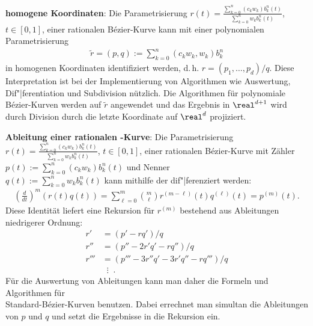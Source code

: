 \textbf{homogene Koordinaten}:
Die Parametrisierung
$r(t) = \frac{\sum_{k=0}^n (c_k w_k) b_k^n(t)}{\sum_{k=0}^n w_k b_k^n(t)}$, $t \in [0, 1]$,
einer rationalen Bézier-Kurve kann mit einer polynomialen Parametrisierung
\begin{align*}
    \widetilde{r} = (p, q) := \sum_{k=0}^n (c_k w_k, w_k) b_k^n
\end{align*}
in homogenen Koordinaten identifiziert werden, d.\,h. $r = (p_1, \dotsc, p_d)/q$.
Diese Interpretation ist bei der Implementierung von Algorithmen wie Auswertung, Dif"|ferentiation
und Subdivision nützlich.
Die Algorithmen für polynomiale Bézier-Kurven werden auf $\widetilde{r}$ angewendet und das
Ergebnis in $\real^{d+1}$ wird durch Division durch die letzte Koordinate auf $\real^d$ projiziert.

\linie

\textbf{Ableitung einer rationalen -Kurve}:
Die Parametrisierung
$r(t) = \frac{\sum_{k=0}^n (c_k w_k) b_k^n(t)}{\sum_{k=0}^n w_k b_k^n(t)}$, $t \in [0, 1]$,
einer rationalen Bézier-Kurve mit Zähler $p(t) := \sum_{k=0}^n (c_k w_k) b_k^n(t)$ und Nenner\\
$q(t) := \sum_{k=0}^n w_k b_k^n(t)$ kann mithilfe der
 dif"|ferenziert werden:
\begin{align*}
    \left(\frac{d}{dt}\right)^m (r(t)q(t)) =
    \sum_{\ell=0}^m \binom{m}{\ell} r^{(m-\ell)}(t) q^{(\ell)}(t) = p^{(m)}(t).
\end{align*}
Diese Identität liefert eine Rekursion für $r^{(m)}$ bestehend aus Ableitungen niedrigerer Ordnung:
\begin{align*}
    r' &= (p' - rq') / q \\
    r'' &= (p'' - 2r'q' - rq'') / q\\
    r''' &= (p''' - 3r''q' - 3r'q'' - rq''') / q\\
    &\;\;\vdots\;\;.
\end{align*}
Für die Auswertung von Ableitungen kann man daher die Formeln und Algorithmen für\\
Standard-Bézier-Kurven benutzen.
Dabei errechnet man simultan die Ableitungen von $p$ und $q$ und setzt die Ergebnisse in die
Rekursion ein.

\linie
\pagebreak

